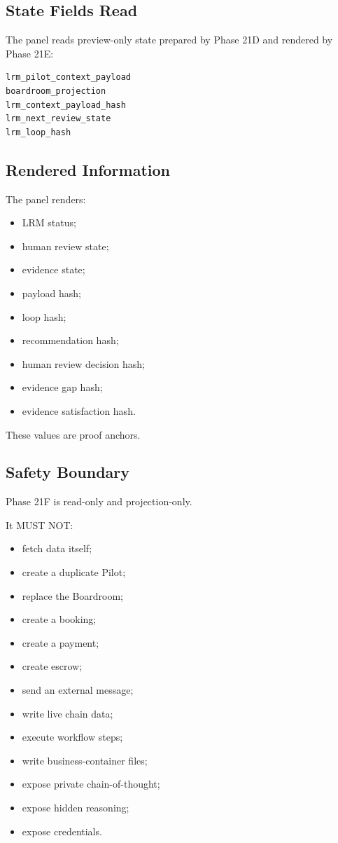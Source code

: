 \subsection{State Fields Read}

The panel reads preview-only state prepared by Phase 21D and rendered by Phase 21E:

\begin{verbatim}
lrm_pilot_context_payload
boardroom_projection
lrm_context_payload_hash
lrm_next_review_state
lrm_loop_hash
\end{verbatim}

\subsection{Rendered Information}

The panel renders:

\begin{itemize}
  \item LRM status;
  \item human review state;
  \item evidence state;
  \item payload hash;
  \item loop hash;
  \item recommendation hash;
  \item human review decision hash;
  \item evidence gap hash;
  \item evidence satisfaction hash.
\end{itemize}

These values are proof anchors.

\subsection{Safety Boundary}

Phase 21F is read-only and projection-only.

It MUST NOT:

\begin{itemize}
  \item fetch data itself;
  \item create a duplicate Pilot;
  \item replace the Boardroom;
  \item create a booking;
  \item create a payment;
  \item create escrow;
  \item send an external message;
  \item write live chain data;
  \item execute workflow steps;
  \item write business-container files;
  \item expose private chain-of-thought;
  \item expose hidden reasoning;
  \item expose credentials.
\end{itemize}

